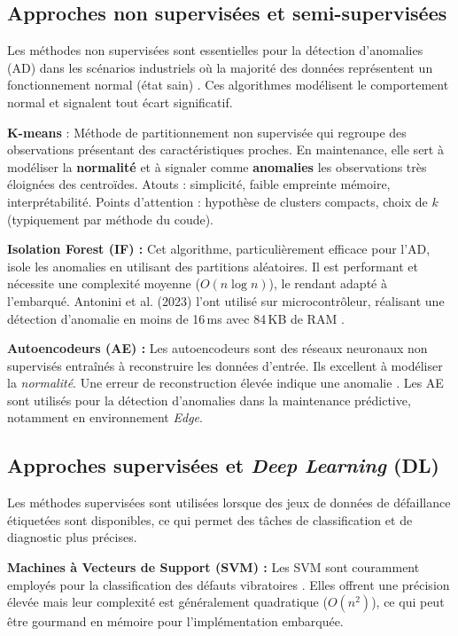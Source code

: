 \subsection{Approches non supervisées et semi-supervisées}

Les méthodes non supervisées sont essentielles pour la détection d'anomalies (AD) dans les scénarios industriels où la majorité des données représentent un fonctionnement normal (état sain) \cite{arciniegas2025}. Ces algorithmes modélisent le comportement normal et signalent tout écart significatif.

\textbf{K-means} \cite{macqueen1967,chandola2009} : Méthode de partitionnement non supervisée qui regroupe des observations présentant des caractéristiques proches. En maintenance, elle sert à modéliser la \textbf{normalité} et à signaler comme \textbf{anomalies} les observations très éloignées des centroïdes. Atouts : simplicité, faible empreinte mémoire, interprétabilité. Points d'attention : hypothèse de clusters compacts, choix de $k$ (typiquement par méthode du coude).

\textbf{Isolation Forest (IF) :} Cet algorithme, particulièrement efficace pour l'AD, isole les anomalies en utilisant des partitions aléatoires. Il est performant et nécessite une complexité moyenne ($O(n \log n)$), le rendant adapté à l'embarqué. Antonini et al. (2023) l'ont utilisé sur microcontrôleur, réalisant une détection d'anomalie en moins de 16\,ms avec 84\,KB de RAM \cite{antonini2023}.

\textbf{Autoencodeurs (AE) :} Les autoencodeurs sont des réseaux neuronaux non supervisés entraînés à reconstruire les données d'entrée. Ils excellent à modéliser la \textit{normalité}. Une erreur de reconstruction élevée indique une anomalie \cite{ran2019}. Les AE sont utilisés pour la détection d'anomalies dans la maintenance prédictive, notamment en environnement \textit{Edge}.

\subsection{Approches supervisées et \textit{Deep Learning} (DL)}

Les méthodes supervisées sont utilisées lorsque des jeux de données de défaillance étiquetées sont disponibles, ce qui permet des tâches de classification et de diagnostic plus précises.

\textbf{Machines à Vecteurs de Support (SVM) :} Les SVM sont couramment employés pour la classification des défauts vibratoires \cite{jemmali2021,ran2019}. Elles offrent une précision élevée mais leur complexité est généralement quadratique ($O(n^2)$), ce qui peut être gourmand en mémoire pour l'implémentation embarquée.

